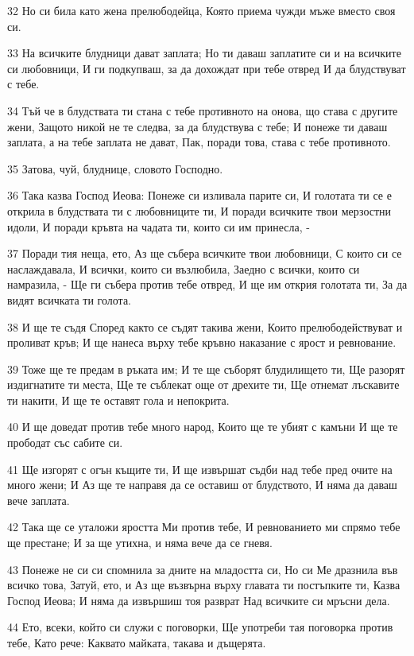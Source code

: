 \par 32 Но си била като жена прелюбодейца, Която приема чужди мъже вместо своя си.
\par 33 На всичките блудници дават заплата; Но ти даваш заплатите си и на всичките си любовници, И ги подкупваш, за да дохождат при тебе отвред И да блудствуват с тебе.
\par 34 Тъй че в блудствата ти стана с тебе противното на онова, що става с другите жени, Защото никой не те следва, за да блудствува с тебе; И понеже ти даваш заплата, а на тебе заплата не дават, Пак, поради това, става с тебе противното.
\par 35 Затова, чуй, блуднице, словото Господно.
\par 36 Така казва Господ Иеова: Понеже си изливала парите си, И голотата ти се е открила в блудствата ти с любовниците ти, И поради всичките твои мерзостни идоли, И поради кръвта на чадата ти, които си им принесла, -
\par 37 Поради тия неща, ето, Аз ще събера всичките твои любовници, С които си се наслаждавала, И всички, които си възлюбила, Заедно с всички, които си намразила, - Ще ги събера против тебе отвред, И ще им открия голотата ти, За да видят всичката ти голота.
\par 38 И ще те съдя Според както се съдят такива жени, Които прелюбодействуват и проливат кръв; И ще нанеса върху тебе кръвно наказание с ярост и ревнование.
\par 39 Тоже ще те предам в ръката им; И те ще съборят блудилището ти, Ще разорят издигнатите ти места, Ще те съблекат още от дрехите ти, Ще отнемат лъскавите ти накити, И ще те оставят гола и непокрита.
\par 40 И ще доведат против тебе много народ, Които ще те убият с камъни И ще те прободат със сабите си.
\par 41 Ще изгорят с огън къщите ти, И ще извършат съдби над тебе пред очите на много жени; И Аз ще те направя да се оставиш от блудството, И няма да даваш вече заплата.
\par 42 Така ще се уталожи яростта Ми против тебе, И ревнованието ми спрямо тебе ще престане; И за ще утихна, и няма вече да се гневя.
\par 43 Понеже не си си спомнила за дните на младостта си, Но си Ме дразнила във всичко това, Затуй, ето, и Аз ще възвърна върху главата ти постъпките ти, Казва Господ Иеова; И няма да извършиш тоя разврат Над всичките си мръсни дела.
\par 44 Ето, всеки, който си служи с поговорки, Ще употреби тая поговорка против тебе, Като рече: Каквато майката, такава и дъщерята.
